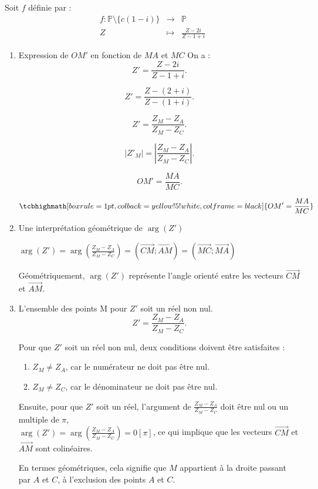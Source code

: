 \documentclass[12pt,a4paper]{article}
\begin{document}
Soit $f$ définie par :
$$
\begin{array}{rcl}
f : \mathbb{P} \setminus \{c(1 - i)\}&\to& \mathbb{P}\\
Z &\mapsto &\frac{Z - 2i}{Z - 1 + i}
\end{array}
$$
\begin{enumerate}
\item Expression de $OM'$ en fonction de $MA$ et $MC$
On a :
\[
Z' = \frac{Z - 2i}{Z - 1 + i}.
\]

\[
Z' = \frac{Z - (2 + i)}{Z - (1 + i)}.
\]

\[
Z' = \frac{Z_M - Z_A}{Z_M - Z_C}.
\]

\[
|Z'_M| = \left|\frac{Z_M - Z_A}{Z_M - Z_C}\right|.
\]

\[
OM' = \frac{MA}{MC}.
\]

\[
\tcbhighmath[boxrule=1pt, colback=yellow!5!white, colframe=black]{ OM' = \frac{MA}{MC} }
\]
\item Une interprétation géométrique de $\arg(Z')$

$\arg(Z')=\arg\left( \frac{Z_M - Z_A}{Z_M - Z_C} \right) = \left( \overrightarrow{CM};\overrightarrow{AM} \right) = \left( \overrightarrow{MC};\overrightarrow{MA} \right) $

Géométriquement, $\arg(Z')$ représente l'angle orienté entre les vecteurs $\overrightarrow{CM}$ et $\overrightarrow{AM}$.
\item L'ensemble des points M pour $Z'$ soit un réel non nul.
 \[
    Z' = \frac{Z_M - Z_A}{Z_M - Z_C}.
    \]

    Pour que $Z'$ soit un réel non nul, deux conditions doivent être satisfaites :
    \begin{enumerate}
        \item \( Z_M \neq Z_A \), car le numérateur ne doit pas être nul.
        \item \( Z_M \neq Z_C \), car le dénominateur ne doit pas être nul.
    \end{enumerate}

    Ensuite, pour que \( Z' \) soit un réel, l'argument de \(\frac{Z_M - Z_A}{Z_M - Z_C}\) doit être nul ou un multiple de \(\pi\),\\$\arg(Z')=\arg\left( \frac{Z_M - Z_A}{Z_M - Z_C} \right)=0[\pi]$, ce qui implique que les vecteurs \(\overrightarrow{CM}\) et \(\overrightarrow{AM}\) sont colinéaires.

    En termes géométriques, cela signifie que \( M \) appartient à la droite passant par \( A \) et \( C \), à l'exclusion des points \( A \) et \( C \).


\end{enumerate}
\end{document}
